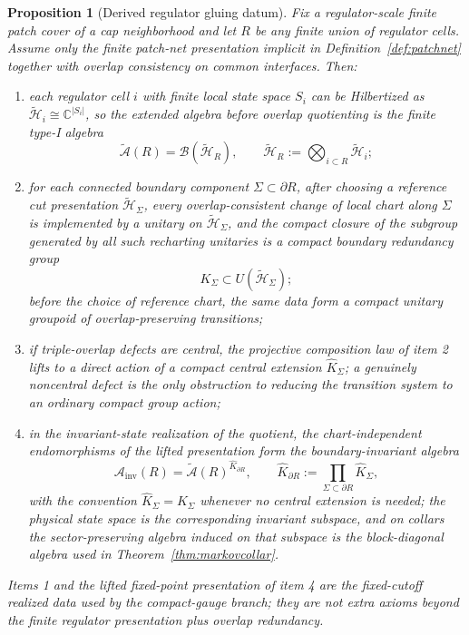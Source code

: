 \documentclass[11pt]{article}
\newtheorem{proposition}[theorem]{Proposition}
\begin{document}
\begin{proposition}[Derived regulator gluing datum]\label{prop:regulatedrealization}
Fix a regulator-scale finite patch cover of a cap neighborhood and let \(R\) be any finite union of regulator cells. Assume only the finite patch-net presentation implicit in Definition~\ref{def:patchnet} together with overlap consistency on common interfaces. Then:
\begin{enumerate}[leftmargin=2em]
\item each regulator cell \(i\) with finite local state space \(S_i\) can be Hilbertized as \(\tilde{\mathcal H}_i\cong \mathbb C^{|S_i|}\), so the extended algebra before overlap quotienting is the finite type-I algebra
\[
\widetilde{\mathcal A}(R)=\mathcal B(\tilde{\mathcal H}_R),
\qquad
\tilde{\mathcal H}_R:=\bigotimes_{i\subset R}\tilde{\mathcal H}_i;
\]
\item for each connected boundary component \(\Sigma\subset\partial R\), after choosing a reference cut presentation \(\tilde{\mathcal H}_\Sigma\), every overlap-consistent change of local chart along \(\Sigma\) is implemented by a unitary on \(\tilde{\mathcal H}_\Sigma\), and the compact closure of the subgroup generated by all such recharting unitaries is a compact boundary redundancy group
\[
K_\Sigma\subset U(\tilde{\mathcal H}_\Sigma);
\]
before the choice of reference chart, the same data form a compact unitary groupoid of overlap-preserving transitions;
\item if triple-overlap defects are central, the projective composition law of item 2 lifts to a direct action of a compact central extension \(\widehat K_\Sigma\); a genuinely noncentral defect is the only obstruction to reducing the transition system to an ordinary compact group action;
\item in the invariant-state realization of the quotient, the chart-independent endomorphisms of the lifted presentation form the boundary-invariant algebra
\[
\mathcal A_{\mathrm{inv}}(R)=\widetilde{\mathcal A}(R)^{\widehat K_{\partial R}},
\qquad
\widehat K_{\partial R}:=\prod_{\Sigma\subset\partial R}\widehat K_\Sigma,
\]
\noindent with the convention \(\widehat K_\Sigma=K_\Sigma\) whenever no central extension is needed; the physical state space is the corresponding invariant subspace, and on collars the sector-preserving algebra induced on that subspace is the block-diagonal algebra used in Theorem~\ref{thm:markovcollar}.
\end{enumerate}
Items 1 and the lifted fixed-point presentation of item 4 are the fixed-cutoff realized data used by the compact-gauge branch; they are not extra axioms beyond the finite regulator presentation plus overlap redundancy.
\end{proposition}
\end{document}
